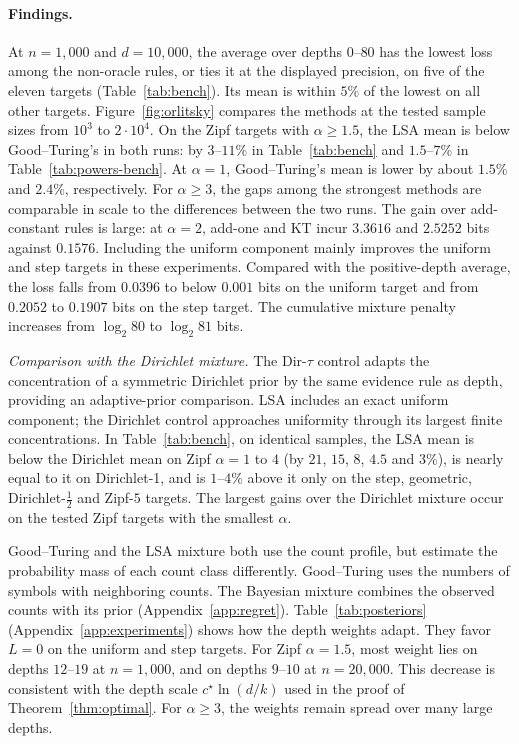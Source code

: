 \documentclass[anon]{alt2027}
\newcommand{\cstar}{c^{\star}}
\begin{document}
\paragraph{Findings.}
At $n=1{,}000$ and $d=10{,}000$, the average over depths $0$--$80$ has the lowest loss among the non-oracle rules, or ties it at the displayed precision, on five of the eleven targets (Table~\ref{tab:bench}). Its mean is within $5\%$ of the lowest on all other targets. Figure~\ref{fig:orlitsky} compares the methods at the tested sample sizes from $10^3$ to $2\cdot10^4$. On the Zipf targets with $\alpha\ge1.5$, the LSA mean is below Good--Turing's in both runs: by $3$--$11\%$ in Table~\ref{tab:bench} and $1.5$--$7\%$ in Table~\ref{tab:powers-bench}. At $\alpha=1$, Good--Turing's mean is lower by about $1.5\%$ and $2.4\%$, respectively. For $\alpha\ge3$, the gaps among the strongest methods are comparable in scale to the differences between the two runs. The gain over add-constant rules is large: at $\alpha=2$, add-one and KT incur $3.3616$ and $2.5252$ bits against $0.1576$. Including the uniform component mainly improves the uniform and step targets in these experiments. Compared with the positive-depth average, the loss falls from $0.0396$ to below $0.001$ bits on the uniform target and from $0.2052$ to $0.1907$ bits on the step target. The cumulative mixture penalty increases from $\log_2 80$ to $\log_2 81$ bits.

\emph{Comparison with the Dirichlet mixture.} The Dir-$\tau$ control adapts the concentration of a symmetric Dirichlet prior by the same evidence rule as depth, providing an adaptive-prior comparison. LSA includes an exact uniform component; the Dirichlet control approaches uniformity through its largest finite concentrations. In Table~\ref{tab:bench}, on identical samples, the LSA mean is below the Dirichlet mean on Zipf $\alpha=1$ to $4$ (by $21$, $15$, $8$, $4.5$ and $3\%$), is nearly equal to it on Dirichlet-1, and is $1$--$4\%$ above it only on the step, geometric, Dirichlet-$\tfrac12$ and Zipf-$5$ targets. The largest gains over the Dirichlet mixture occur on the tested Zipf targets with the smallest $\alpha$. 

Good--Turing and the LSA mixture both use the count profile, but estimate the probability mass of each count class differently. Good--Turing uses the numbers of symbols with neighboring counts. The Bayesian mixture combines the observed counts with its prior (Appendix~\ref{app:regret}). Table~\ref{tab:posteriors} (Appendix~\ref{app:experiments}) shows how the depth weights adapt. They favor $L=0$ on the uniform and step targets. For Zipf $\alpha=1.5$, most weight lies on depths $12$--$19$ at $n=1{,}000$, and on depths $9$--$10$ at $n=20{,}000$. This decrease is consistent with the depth scale $\cstar\ln(d/k)$ used in the proof of Theorem~\ref{thm:optimal}. For $\alpha\ge3$, the weights remain spread over many large depths. 
\end{document}
